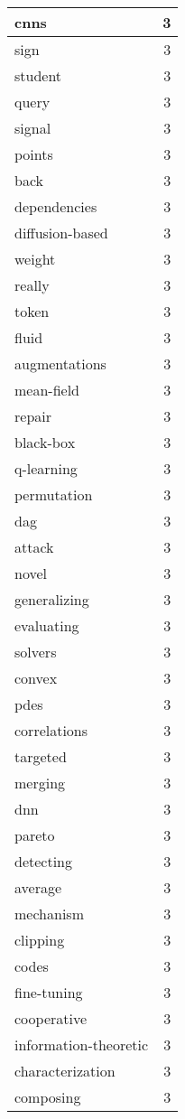 \begin{table}[h]
\begin{tabular}{|l|r|}
\hline
cnns & 3 \\
\hline
sign & 3 \\
\hline
student & 3 \\
\hline
query & 3 \\
\hline
signal & 3 \\
\hline
points & 3 \\
\hline
back & 3 \\
\hline
dependencies & 3 \\
\hline
diffusion-based & 3 \\
\hline
weight & 3 \\
\hline
really & 3 \\
\hline
token & 3 \\
\hline
fluid & 3 \\
\hline
augmentations & 3 \\
\hline
mean-field & 3 \\
\hline
repair & 3 \\
\hline
black-box & 3 \\
\hline
q-learning & 3 \\
\hline
permutation & 3 \\
\hline
dag & 3 \\
\hline
attack & 3 \\
\hline
novel & 3 \\
\hline
generalizing & 3 \\
\hline
evaluating & 3 \\
\hline
solvers & 3 \\
\hline
convex & 3 \\
\hline
pdes & 3 \\
\hline
correlations & 3 \\
\hline
targeted & 3 \\
\hline
merging & 3 \\
\hline
dnn & 3 \\
\hline
pareto & 3 \\
\hline
detecting & 3 \\
\hline
average & 3 \\
\hline
mechanism & 3 \\
\hline
clipping & 3 \\
\hline
codes & 3 \\
\hline
fine-tuning & 3 \\
\hline
cooperative & 3 \\
\hline
information-theoretic & 3 \\
\hline
characterization & 3 \\
\hline
composing & 3 \\

\end{tabular}
\end{table}
